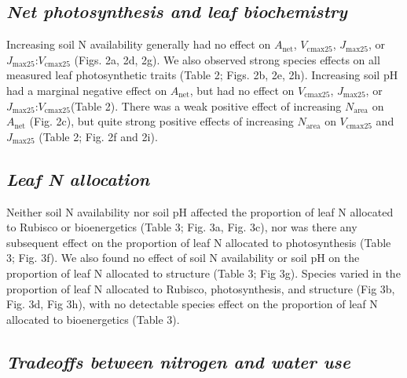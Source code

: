     \clearpage

    \clearpage


    \newpage
    \subsection{\textit{Net photosynthesis and leaf biochemistry}}

    Increasing soil N availability generally had no effect on $A_\mathrm{net}$, $V_\mathrm{cmax25}$, $J_\mathrm{max25}$, or $J_\mathrm{max25}$:$V_\mathrm{cmax25}$ (Figs. 2a, 2d, 2g). We also observed strong species effects on all measured leaf photosynthetic traits (Table 2; Figs. 2b, 2e, 2h). Increasing soil pH had a marginal negative effect on $A_\mathrm{net}$, but had no effect on $V_\mathrm{cmax25}$, $J_\mathrm{max25}$, or $J_\mathrm{max25}$:$V_\mathrm{cmax25}$(Table 2). There was a weak positive effect of increasing $N_\mathrm{area}$ on $A_\mathrm{net}$ (Fig. 2c), but quite strong positive effects of increasing $N_\mathrm{area}$ on $V_\mathrm{cmax25}$ and $J_\mathrm{max25}$ (Table 2; Fig. 2f and 2i).
    \clearpage
    
    \clearpage

    \clearpage

    \newpage
    \subsection{\textit{Leaf N allocation}}
    Neither soil N availability nor soil pH affected the proportion of leaf N allocated to Rubisco or bioenergetics (Table 3; Fig. 3a, Fig. 3c), nor was there any subsequent effect on the proportion of leaf N allocated to photosynthesis (Table 3; Fig. 3f). We also found no effect of soil N availability or soil pH on the proportion of leaf N allocated to structure (Table 3; Fig 3g). Species varied in the proportion of leaf N allocated to Rubisco, photosynthesis, and structure (Fig 3b, Fig. 3d, Fig 3h), with no detectable species effect on the proportion of leaf N allocated to bioenergetics (Table 3).
    \clearpage

    \clearpage

    \clearpage

    \newpage
    \subsection{\textit{Tradeoffs between nitrogen and water use }}
    
